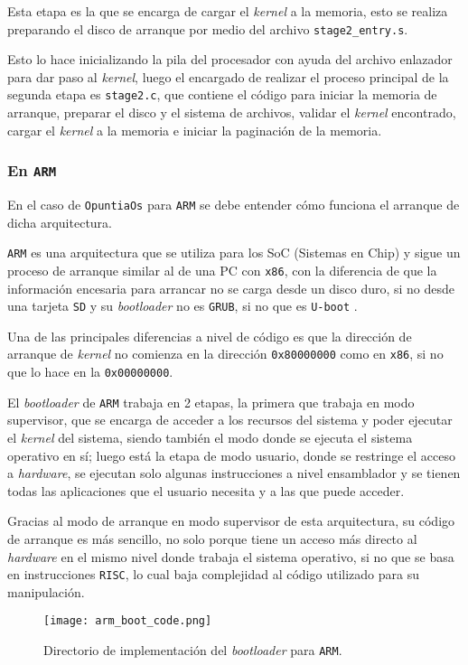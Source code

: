 	
	
	Esta etapa es la que se encarga de cargar el \textit{kernel} a la memoria, esto se realiza preparando el disco de arranque por medio del archivo \texttt{stage2\_entry.s}.
	
	
	
	Esto lo hace inicializando la pila del procesador con ayuda del archivo enlazador para dar paso al \textit{kernel}, luego el encargado de realizar el proceso principal de la segunda etapa es \texttt{stage2.c}, que contiene el código para iniciar la memoria de arranque, preparar el disco y el sistema de archivos, validar el \textit{kernel} encontrado, cargar el \textit{kernel} a la memoria e iniciar la paginación de la memoria.

	
	
	
	\subsubsection{En \texttt{ARM}}
	En el caso de \texttt{OpuntiaOs} para \texttt{ARM} se debe entender cómo funciona el arranque de dicha arquitectura.
	
	
	
	\texttt{ARM} es una arquitectura que se utiliza para los SoC (Sistemas en Chip) y sigue un proceso de arranque similar al de una PC con \texttt{x86}, con la diferencia de que la información encesaria para arrancar no se carga desde un disco duro, si no desde una tarjeta \texttt{SD} y su \textit{bootloader} no es \texttt{GRUB}, si no que es \texttt{U-boot} \cite{vargas_risc}.

	
	
	Una de las principales diferencias a nivel de código es que la dirección de arranque de \textit{kernel} no comienza en la dirección \texttt{0x80000000} como en \texttt{x86}, si no que lo hace en la \texttt{0x00000000}.
	
	
	
	El \textit{bootloader} de \texttt{ARM} trabaja en 2 etapas, la primera que trabaja en modo supervisor, que se encarga de acceder a los recursos del sistema y poder ejecutar el \textit{kernel} del sistema, siendo también el modo donde se ejecuta el sistema operativo en sí; luego está la etapa de modo usuario, donde se restringe el acceso a \textit{hardware}, se ejecutan solo algunas instrucciones a nivel ensamblador y se tienen todas las aplicaciones que el usuario necesita y a las que puede acceder.
	
	
	
	Gracias al modo de arranque en modo supervisor de esta arquitectura, su código de arranque es más sencillo, no solo porque tiene un acceso más directo al \textit{hardware} en el mismo nivel donde trabaja el sistema operativo, si no que se basa en instrucciones \texttt{RISC}, lo cual baja complejidad al código utilizado para su manipulación.
	\begin{figure}[ht]
		\centering
		\texttt{[image: arm\_boot\_code.png]}
		\caption{
			Directorio de implementación del \textit{bootloader} para \texttt{ARM}.
			\label{fig:arm_boot_code}
		}
	\end{figure}
	
